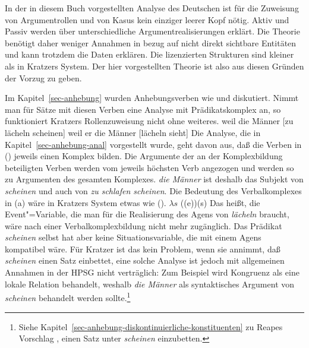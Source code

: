 {In der in diesem Buch vorgestellten Analyse des Deutschen ist für die Zuweisung
von Argumentrollen und von Kasus kein einziger leerer Kopf nötig. Aktiv und Passiv
werden über unterschiedliche Argumentrealisierungen erklärt. Die Theorie benötigt
daher weniger Annahmen in bezug auf nicht direkt sichtbare Entitäten und kann trotzdem
die Daten erklären. Die lizenzierten Strukturen sind kleiner als in Kratzers System.
Der hier vorgestellten Theorie ist also aus diesen Gründen der Vorzug zu geben.%


Im Kapitel~\ref{sec-anhebung} wurden Anhebungsverben wie  und  diskutiert.
Nimmt man für Sätze mit diesen Verben eine Analyse mit Prädikatskomplex an, so funktioniert Kratzers
Rollenzuweisung nicht ohne weiteres.
\eal
\ex weil die Männer [zu lächeln scheinen]
\ex weil er die Männer [lächeln sieht]
\zl
Die Analyse, die in Kapitel~\ref{sec-anhebung-anal} vorgestellt wurde, geht davon aus, daß die Verben
in () jeweils einen Komplex bilden. Die Argumente der an der Komplexbildung beteiligten Verben
werden vom jeweils höchsten Verb angezogen und werden so zu Argumenten des gesamten Komplexes.
\emph{die Männer} ist deshalb das Subjekt von \emph{scheinen} und auch von \emph{zu schlafen scheinen}. Die
Bedeutung des Verbalkomplexes in (a) wäre in Kratzers System etwas wie ().
\ea
$\lambda s$ ((e))(s)
\z
Das heißt, die Event"=Variable, die man für die Realisierung des Agens von \emph{lächeln} braucht, wäre
nach einer Verbalkomplexbildung nicht mehr zugänglich. Das Prädikat \emph{scheinen} selbst
hat aber keine Situationsvariable, die mit einem Agens kompatibel wäre.
Für Kratzer ist das kein Problem, wenn sie annimmt, daß \emph{scheinen} einen Satz einbettet, 
eine solche Analyse ist jedoch mit allgemeinen Annahmen in der HPSG nicht verträglich: 
Zum Beispiel wird Kongruenz als eine lokale Relation behandelt, weshalb
\emph{die Männer} als syntaktisches Argument von \emph{scheinen} behandelt werden sollte.\footnote{
  Siehe Kapitel~\ref{sec-anhebung-diskontinuierliche-konstituenten}
zu Reapes Vorschlag \citeyearpar{Reape94a},
  einen Satz unter \emph{scheinen} einzubetten.%
}

}
